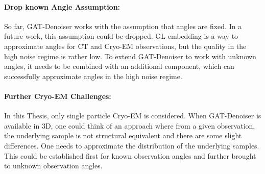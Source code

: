 \paragraph{Drop known Angle Assumption:}
So far, GAT-Denoiser works with the assumption that angles are fixed.
In a future work, this assumption could be dropped. GL embedding
is a way to approximate angles for CT and Cryo-EM observations, but the quality in the high noise regime is rather low.
To extend GAT-Denoiser to work with unknown angles, it needs to be combined with an additional component, 
which can successfully approximate angles in the high noise regime.

\paragraph{Further Cryo-EM Challenges:}
In this Thesis, only single particle Cryo-EM is considered.
When GAT-Denoiser is available in 3D, one could think of an approach
where from a given observation, the underlying sample is not 
structural equivalent and there are some slight differences. 
One needs to approximate the distribution of the underlying samples.
This could be established first for known observation angles and further brought to unknown observation angles.

